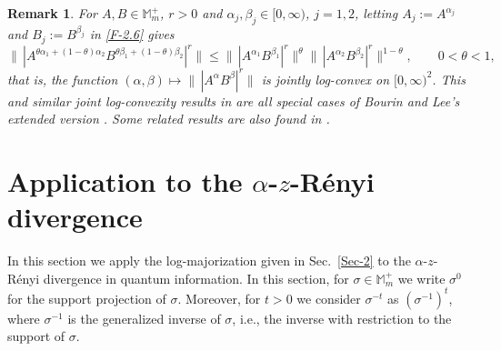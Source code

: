 \documentclass[11pt,reqno]{article}
\newtheorem{corollary}[theorem]{Corollary}
\newtheorem{remark}[theorem]{Remark}
\numberwithin{equation}{section}
\def\bM{\mathbb{M}}
\begin{document}
\begin{remark}\label{R-2.4}\rm
For $A,B\in\bM_m^+$, $r>0$ and $\alpha_j,\beta_j\in[0,\infty)$, $j=1,2$, letting $A_j:=A^{\alpha_j}$ and
$B_j:=B^{\beta_j}$ in \eqref{F-2.6} gives
\[
\big\|\,|A^{\theta\alpha_1+(1-\theta)\alpha_2}B^{\theta\beta_1+(1-\theta)\beta_2}|^r\big\|
\le\big\|\,|A^{\alpha_1}B^{\beta_1}|^r\big\|^\theta
\big\|\,|A^{\alpha_2}B^{\beta_2}|^r\big\|^{1-\theta},\qquad0<\theta<1,
\]
that is, the function $(\alpha,\beta)\mapsto\|\,|A^\alpha B^\beta|^r\|$ is jointly log-convex on $[0,\infty)^2$.
This and similar joint log-convexity results in \cite{Hi2,Sa} are all special cases of Bourin and Lee's
extended version \cite[Theorem 1.2]{BL}. Some related results are also found in \cite{BS}.
\end{remark}

%
%

\section{Application to the $\alpha$-$z$-R\'enyi divergence}\label{Sec-3}

In this section we apply the log-majorization given in Sec.~\ref{Sec-2} to the $\alpha$-$z$-R\'enyi divergence
in quantum information. In this section, for $\sigma\in\bM_m^+$ we write $\sigma^0$ for the support projection
of $\sigma$. Moreover, for $t>0$ we consider $\sigma^{-t}$ as $(\sigma^{-1})^t$, where $\sigma^{-1}$ is the
generalized inverse of $\sigma$, i.e., the inverse with restriction to the support of $\sigma$.
\end{document}
